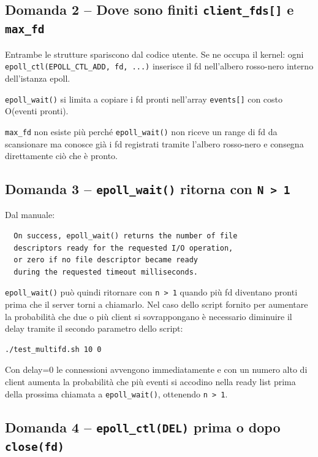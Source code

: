 \documentclass[a4paper,12pt]{article}
\begin{document}
\subsection*{Domanda 2 -- Dove sono finiti \texttt{client\_fds[]} e \texttt{max\_fd}}

Entrambe le strutture spariscono dal codice utente. Se ne occupa il kernel: ogni
\texttt{epoll\_ctl(EPOLL\_CTL\_ADD, fd, ...)} inserisce il fd nell'albero rosso-nero
interno dell'istanza epoll.

\texttt{epoll\_wait()} si limita a copiare i fd pronti nell'array \texttt{events[]}
 con costo O(eventi pronti).

\texttt{max\_fd} non esiste più perché \texttt{epoll\_wait()} non riceve un range di fd
da scansionare ma conosce già i fd registrati tramite l'albero rosso-nero e consegna
direttamente ciò che è pronto.

\subsection*{Domanda 3 -- \texttt{epoll\_wait()} ritorna con \texttt{N > 1}}

Dal manuale:

\begin{verbatim}
  On success, epoll_wait() returns the number of file
  descriptors ready for the requested I/O operation,
  or zero if no file descriptor became ready
  during the requested timeout milliseconds.
\end{verbatim}

\texttt{epoll\_wait()} può quindi ritornare con \texttt{n > 1} quando più fd diventano
pronti prima che il server torni a chiamarlo. Nel caso dello script fornito
per aumentare la probabilità che due o più client si sovrappongano è necessario
diminuire il delay tramite il secondo parametro dello script:

\begin{lstlisting}
./test_multifd.sh 10 0
\end{lstlisting}

Con delay=0 le connessioni avvengono immediatamente e con un numero alto di client
aumenta la probabilità che più eventi si accodino nella ready list prima della prossima
chiamata a \texttt{epoll\_wait()}, ottenendo \texttt{n > 1}.

\subsection*{Domanda 4 -- \texttt{epoll\_ctl(DEL)} prima o dopo \texttt{close(fd)}}
\end{document}
